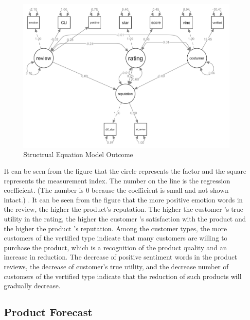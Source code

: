 \documentclass[12pt,a4paper,]{article}
\begin{document}
\begin{figure}

{\centering \includegraphics[width=0.8\linewidth]{sem} 

}

\caption{Structrual Equation Model Outcome}\label{fig:unnamed-chunk-23}
\end{figure}

It can be seen from the figure that the circle represents the factor and
the square represents the measurement index. The number on the line is
the regression coefficient. (The number is 0 because the coefficient is
small and not shown intact.) . It can be seen from the figure that the
more positive emotion words in the review, the higher the product's
reputation. The higher the customer 's true utility in the rating, the
higher the customer 's satisfaction with the product and the higher the
product 's reputation. Among the customer types, the more customers of
the vertified type indicate that many customers are willing to purchase
the product, which is a recognition of the product quality and an
increase in reduction. The decrease of positive sentiment words in the
product reviews, the decrease of customer's true utility, and the
decrease number of customers of the vertified type indicate that the
reduction of such products will gradually decrease.

\hypertarget{product-forecast}{%
\subsection{Product Forecast}\label{product-forecast}}
\end{document}
